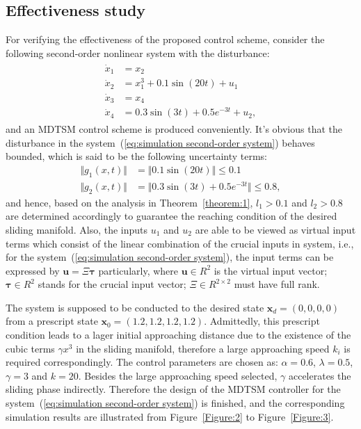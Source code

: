 \documentclass[3p]{elsarticle}
\theoremstyle{plain}
\theoremstyle{remark}
\begin{document}
\subsection{Effectiveness study}
For verifying the effectiveness of the proposed control scheme, consider the following second-order nonlinear system with the disturbance:
\begin{align}
\begin{split}
\dot x_1 &= x_2\\
\dot x_2 &= x_1^3+0.1\sin(20t)+u_1\\
\dot x_3 &= x_4\\
\dot x_4 &= 0.3\sin(3t)+0.5e^{-3t}+u_2,\label{eq:simulation second-order system}
\end{split}
\end{align}
and an MDTSM control scheme is produced conveniently. It's obvious that the disturbance in the system~(\ref{eq:simulation second-order system}) behaves bounded, which is said to be the following uncertainty terms:
\begin{align*}
\Vert g_1(x,t)\Vert &= \Vert 0.1\sin(20t)\Vert\le 0.1\\
\Vert g_2(x,t)\Vert &= \Vert 0.3\sin(3t)+0.5e^{-3t}\Vert\le 0.8,
\end{align*}
and hence, based on the analysis in Theorem~\ref{theorem:1}, $l_1>0.1$ and $l_2>0.8$ are determined accordingly to guarantee the reaching condition of the desired sliding manifold. Also, the inputs $u_1$ and $u_2$ are able to be viewed as virtual input terms which consist of the linear combination of the crucial inputs in system, i.e., for the system~(\ref{eq:simulation second-order system}), the input terms can be expressed by $\bm u = \Xi\bm\tau$ particularly, where $\bm u\in R^2$ is the virtual input vector; $\bm \tau\in R^2$ stands for the crucial input vector; $\Xi\in R^{2\times 2}$ must have full rank.\par
The system is supposed to be conducted to the desired state $\bm x_d=(0,0,0,0)$ from a prescript state $\bm x_0=(1.2,1.2,1.2,1.2)$. Admittedly, this prescript condition leads to a lager initial approaching distance due to the existence of the cubic terms $\gamma x^3$ in the sliding manifold, therefore a large approaching speed $k_i$ is required correspondingly. The control parameters are chosen as: $\alpha = 0.6$, $\lambda = 0.5$, $\gamma = 3$ and $k = 20$. Besides the large approaching speed selected, $\gamma$ accelerates the sliding phase indirectly. Therefore the design of the MDTSM controller for the system~(\ref{eq:simulation second-order system}) is finished, and the corresponding simulation results are illustrated from Figure~\ref{Figure:2} to Figure~\ref{Figure:3}.\par
\end{document}
